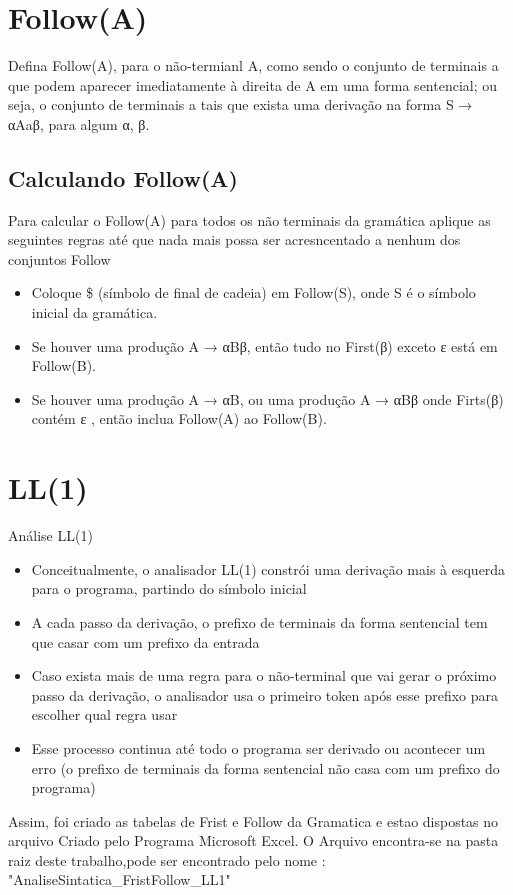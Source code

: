 \section{Follow(A)}

Defina Follow(A), para o não-termianl A, como 
sendo o conjunto de terminais a que podem 
aparecer imediatamente à direita de A em uma 
forma sentencial; ou seja, o conjunto de terminais 
a tais que exista uma derivação na forma S → 
αAaβ, para algum α, β.
\subsection{Calculando Follow(A)}

Para calcular o Follow(A) para todos os nãoterminais da gramática aplique as seguintes 
regras até que nada mais possa ser 
acresncentado a nenhum dos conjuntos Follow

   
\begin{itemize}
    
       \item  Coloque {\$} (símbolo de final de cadeia) em 
Follow(S), onde S é o símbolo inicial da 
gramática.
\item
 Se houver uma produção A → αBβ, então tudo 
no First(β) exceto ε está em Follow(B).
\item
Se houver uma produção A → αB, ou uma 
produção A → αBβ onde Firts(β) contém ε , 
então inclua Follow(A) ao Follow(B).
   \end{itemize}
   
   
\section{LL(1)}

Análise LL(1)
   
\begin{itemize}
\item Conceitualmente, o analisador LL(1) constrói uma derivação mais à esquerda
para o programa, partindo do símbolo inicial
\item A cada passo da derivação, o prefixo de terminais da forma sentencial tem 
que casar com um prefixo da entrada
\item Caso exista mais de uma regra para o não-terminal que vai gerar o próximo 
passo da derivação, o analisador usa o primeiro token após esse prefixo para 
escolher qual regra usar

\item Esse processo continua até todo o programa ser derivado ou acontecer um 
erro (o prefixo de terminais da forma sentencial não casa com um prefixo do 
programa)

   \end{itemize}
   Assim, foi criado as tabelas de Frist e Follow da Gramatica e estao dispostas no arquivo Criado pelo Programa Microsoft Excel.
   O Arquivo encontra-se na pasta raiz deste trabalho,pode ser encontrado pelo nome : "AnaliseSintatica\_FristFollow\_LL1"
   
   